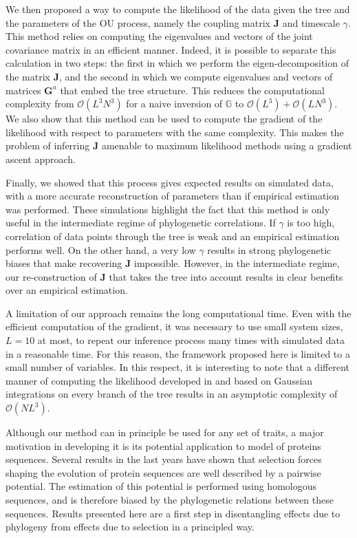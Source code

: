 \documentclass[preprint,amsmath,amssymb,superscriptaddress,showpacs,pre]{revtex4-1}
\begin{document}
We then proposed a way to compute the likelihood of the data given the tree and the parameters of the OU process, namely the coupling matrix $\mathbf{J}$ and timescale $\gamma$.
This method relies on computing the eigenvalues and vectors of the joint covariance matrix in an efficient manner. 
Indeed, it is possible to separate this calculation in two steps: the first in which we perform the eigen-decomposition of the matrix $\mathbf{J}$, and the second in which we compute eigenvalues and vectors of matrices $\mathbf{G}^a$ that embed the tree structure. 
This reduces the computational complexity from $\mathcal{O}(L^3N^3)$ for a naive inversion of $\mathbb{G}$ to $\mathcal{O}(L^3) + \mathcal{O}(LN^3)$. 
We also show that this method can be used to compute the gradient of the likelihood with respect to parameters with the same complexity.
This makes the problem of inferring $\mathbf{J}$ amenable to maximum likelihood methods using a gradient ascent approach. 

Finally, we showed that this process gives expected results on simulated data, with a more accurate reconstruction of parameters than if empirical estimation was performed. 
These simulations highlight the fact that this method is only useful in the intermediate regime of phylogenetic correlations. 
If $\gamma$ is too high, correlation of data points through the tree is weak and an empirical estimation performs well. 
On the other hand, a very low $\gamma$ results in strong phylogenetic biases that make recovering $\mathbf{J}$ impossible.
However, in the intermediate regime, our re-construction of $\mathbf{J}$ that takes the tree into account results in clear benefits over an empirical estimation. 

A limitation of our approach remains the long computational time. 
Even with the efficient computation of the gradient, it was necessary to use small system sizes, $L=10$ at most, to repeat our inference process many times with simulated data in a reasonable time. 
For this reason, the framework proposed here is limited to a small number of variables. 
In this respect, it is interesting to note that a different manner of computing the likelihood developed in \cite{mitov_fast_2020} and based on Gaussian integrations on every branch of the tree results in an asymptotic complexity of $\mathcal{O}(NL^3)$. 

Although our method can in principle be used for any set of traits, a major motivation in developing it is its potential application to model of proteins sequences. 
Several results in the last years have shown that selection forces shaping the evolution of protein sequences are well described by a pairwise potential. 
The estimation of this potential is performed using homologous sequences, and is therefore biased by the phylogenetic relations between these sequences.  
Results presented here are a first step in disentangling effects due to phylogeny from effects due to selection in a principled way. 
\end{document}
